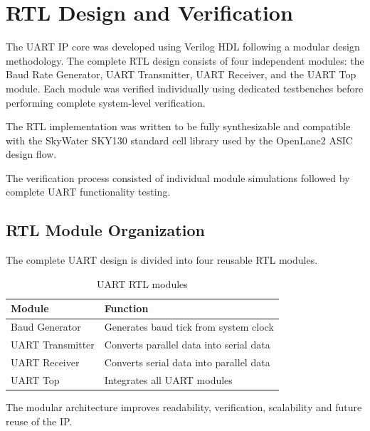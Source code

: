 \chapter{RTL Design and Verification}
\label{chap:rtl_design}

The UART IP core was developed using Verilog HDL following a modular design methodology. The complete RTL design consists of four independent modules: the Baud Rate Generator, UART Transmitter, UART Receiver, and the UART Top module. Each module was verified individually using dedicated testbenches before performing complete system-level verification.

The RTL implementation was written to be fully synthesizable and compatible with the SkyWater SKY130 standard cell library used by the OpenLane2 ASIC design flow.

\vspace{0.3cm}

The verification process consisted of individual module simulations followed by complete UART functionality testing.


\section{RTL Module Organization}

The complete UART design is divided into four reusable RTL modules.

\begin{table}[!htbp]
\centering
\caption{UART RTL modules}
\label{tab:rtl_modules}
\begin{tabular}{ll}
\toprule
Module & Function\\
\midrule
Baud Generator & Generates baud tick from system clock\\
UART Transmitter & Converts parallel data into serial data\\
UART Receiver & Converts serial data into parallel data\\
UART Top & Integrates all UART modules\\
\bottomrule
\end{tabular}
\end{table}

The modular architecture improves readability, verification, scalability and future reuse of the IP.


